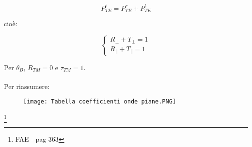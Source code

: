 {\Large \begin{equation}
    P_{TE} ^{i} = P_{TE} ^{r} + P_{TE} ^{t} 
\end{equation}} 

cioè: 

{\Large \begin{equation}
    \begin{cases}
        R_\perp + T_\perp = 1 \\ 
        R_\parallel + T_\parallel = 1 
    \end{cases}
\end{equation}} 


Per $\theta_B$, $R_{TM} = 0$ e $\tau_{TM} = 1$. \\ \\ 

Per riassumere: 

\begin{figure}[h]
    \centering
    \texttt{[image: Tabella coefficienti onde piane.PNG]}
    
\end{figure}  

\footnote{FAE - pag 363} 

\newpage 


